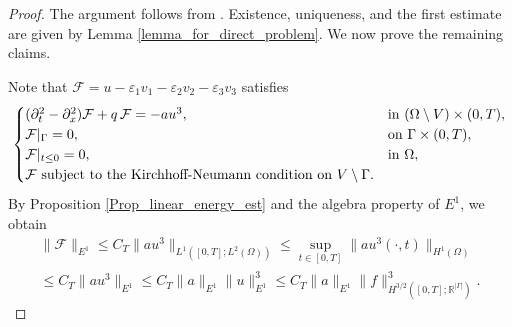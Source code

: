 \documentclass[11pt]{amsart}
\theoremstyle{definition}
\theoremstyle{plain}
\numberwithin{equation}{section}
\begin{document}
\begin{proof}
The argument follows from \cite[Proposition 2]{LassasLiimatainenPotenciano-MachadoTyni}.  
Existence, uniqueness, and the first estimate are given by Lemma \ref{lemma_for_direct_problem}.  
We now prove the remaining claims.  

Note that $\mathcal{F} = u - \varepsilon_1 v_1 - \varepsilon_2 v_2 - \varepsilon_3 v_3$ satisfies
\begin{equation*}
\begin{cases}
(\partial_{t}^2 -\partial_x^2 ) \mathcal{F}+q\,\mathcal{F}
=-au^3, &\text{in } (\Omega\setminus V)\times (0,T),\\
\mathcal{F}\arrowvert_{\Gamma}=0, & \text{on }\Gamma\times(0,T),\\
\mathcal{F}\arrowvert_{t \leq 0}=0, & \text{in }\Omega, \\
\mathcal{F} \text{ subject to the Kirchhoff-Neumann condition on } V\setminus\Gamma.
\end{cases}
\end{equation*}
By Proposition \ref{Prop_linear_energy_est} and the algebra property of $E^1$, we obtain
\begin{multline}\label{est_F}
    \|\mathcal{F}\|_{E^1} 
    \leq   C_T \|au^3\|_{L^1([0,T]; L^2(\Omega))} \leq \sup_{t\in [0,T]} \|au^3(\cdot, t)\|_{H^1(\Omega)}\\
    \leq C_T \|au^3\|_{E^1}
    \leq C_T \|a\|_{E^1}\|u\|_{E^1}^3
    \leq C_T \|a\|_{E^1}\|f\|_{H^{3/2}([0,T];\mathbb{R}^{|\Gamma|})}^3.
\end{multline}


\end{proof}
\end{document}
